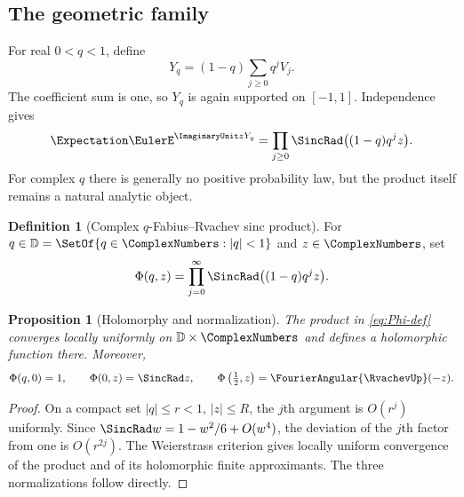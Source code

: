 \documentclass[11pt]{article}
\newtheorem{proposition}[theorem]{Proposition}
\theoremstyle{definition}
\newtheorem{definition}[theorem]{Definition}
\newcommand{\D}{\mathbb D}
\begin{document}
\subsection{The geometric family}

For real $0<q<1$, define
\begin{equation}
 Y_q=(1-q)\sum_{j\ge0}q^jV_j.
 \label{eq:Yq}
\end{equation}
The coefficient sum is one, so $Y_q$ is again supported on $[-1,1]$.  Independence gives
\begin{equation}
 \Expectation\EulerE^{\ImaginaryUnit zY_q}
 =\prod_{j\ge0}\SincRad\bigl((1-q)q^jz\bigr).
 \label{eq:real-char}
\end{equation}
For complex $q$ there is generally no positive probability law, but the product itself remains a natural analytic object.

\begin{definition}[Complex $q$-Fabius--Rvachev sinc product]
For $q\in\D=\SetOf{q\in\ComplexNumbers:|q|<1}$ and $z\in\ComplexNumbers$, set
\begin{equation}
 \Phi(q,z)=\prod_{j=0}^{\infty}
 \SincRad\bigl((1-q)q^jz\bigr).
 \label{eq:Phi-def}
\end{equation}
\end{definition}

\begin{proposition}[Holomorphy and normalization]
The product in \cref{eq:Phi-def} converges locally uniformly on $\D\times\ComplexNumbers$ and defines a holomorphic function there.  Moreover,
\[
 \Phi(q,0)=1,
 \qquad
 \Phi(0,z)=\SincRad z,
 \qquad
 \Phi\left(\tfrac12,z\right)=\FourierAngular{\RvachevUp}(-z).
\]
\end{proposition}

\begin{proof}
On a compact set $|q|\le r<1$, $|z|\le R$, the $j$th argument is $O(r^j)$ uniformly.  Since $\SincRad w=1-w^2/6+O(w^4)$, the deviation of the $j$th factor from one is $O(r^{2j})$.  The Weierstrass criterion gives locally uniform convergence of the product and of its holomorphic finite approximants.  The three normalizations follow directly.
\end{proof}
\end{document}
